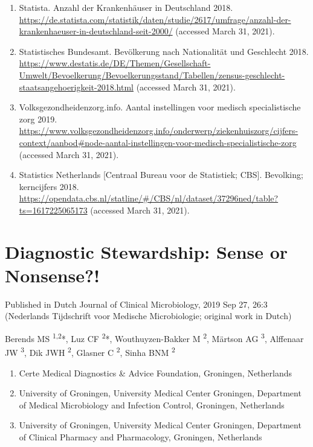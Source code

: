 \documentclass[
]{book}
\providecommand{\tightlist}{%
  \setlength{\itemsep}{0pt}\setlength{\parskip}{0pt}}
\begin{document}
\begin{enumerate}
\item
  Statista. Anzahl der Krankenhäuser in Deutschland 2018. \url{https://de.statista.com/statistik/daten/studie/2617/umfrage/anzahl-der-krankenhaeuser-in-deutschland-seit-2000/} (accessed March 31, 2021).
\item
  Statistisches Bundesamt. Bevölkerung nach Nationalität und Geschlecht 2018. \url{https://www.destatis.de/DE/Themen/Gesellschaft-Umwelt/Bevoelkerung/Bevoelkerungsstand/Tabellen/zensus-geschlecht-staatsangehoerigkeit-2018.html} (accessed March 31, 2021).
\item
  Volksgezondheidenzorg.info. Aantal instellingen voor medisch specialistische zorg 2019. \url{https://www.volksgezondheidenzorg.info/onderwerp/ziekenhuiszorg/cijfers-context/aanbod\#node-aantal-instellingen-voor-medisch-specialistische-zorg} (accessed March 31, 2021).
\item
  Statistics Netherlands {[}Centraal Bureau voor de Statistiek; CBS{]}. Bevolking; kerncijfers 2018. \url{https://opendata.cbs.nl/statline/\#/CBS/nl/dataset/37296ned/table?ts=1617225065173} (accessed March 31, 2021).
\end{enumerate}

\hypertarget{diagnostic-stewardship}{%
\chapter{Diagnostic Stewardship: Sense or Nonsense?!}\label{diagnostic-stewardship}}

Published in Dutch Journal of Clinical Microbiology, 2019 Sep 27, 26:3\\
(Nederlands Tijdschrift voor Medische Microbiologie; original work in Dutch)

Berends MS \textsuperscript{1,2}*, Luz CF \textsuperscript{2}*, Wouthuyzen-Bakker M \textsuperscript{2}, Märtson AG \textsuperscript{3}, Alffenaar JW \textsuperscript{3}, Dik JWH \textsuperscript{2}, Glasner C \textsuperscript{2}, Sinha BNM \textsuperscript{2}

\begin{enumerate}
\def\labelenumi{\arabic{enumi}.}
\tightlist
\item
  Certe Medical Diagnostics \& Advice Foundation, Groningen, Netherlands
\item
  University of Groningen, University Medical Center Groningen, Department of Medical Microbiology and Infection Control, Groningen, Netherlands
\item
  University of Groningen, University Medical Center Groningen, Department of Clinical Pharmacy and Pharmacology, Groningen, Netherlands
\end{enumerate}
\end{document}
